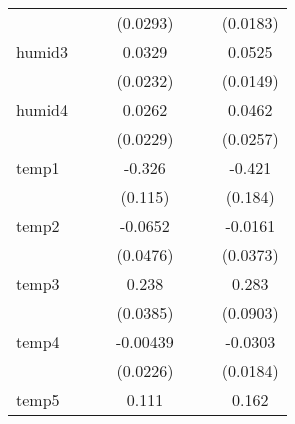 {\begin{tabular}{l*{6}{c}}
            &                     &                     &    (0.0293)         &                     &                     &    (0.0183)         \\
[1em]
humid3      &                     &                     &      0.0329         &                     &                     &      0.0525\sym{**} \\
            &                     &                     &    (0.0232)         &                     &                     &    (0.0149)         \\
[1em]
humid4      &                     &                     &      0.0262         &                     &                     &      0.0462         \\
            &                     &                     &    (0.0229)         &                     &                     &    (0.0257)         \\
[1em]
temp1       &                     &                     &      -0.326\sym{**} &                     &                     &      -0.421\sym{*}  \\
            &                     &                     &     (0.115)         &                     &                     &     (0.184)         \\
[1em]
temp2       &                     &                     &     -0.0652         &                     &                     &     -0.0161         \\
            &                     &                     &    (0.0476)         &                     &                     &    (0.0373)         \\
[1em]
temp3       &                     &                     &       0.238\sym{***}&                     &                     &       0.283\sym{**} \\
            &                     &                     &    (0.0385)         &                     &                     &    (0.0903)         \\
[1em]
temp4       &                     &                     &    -0.00439         &                     &                     &     -0.0303         \\
            &                     &                     &    (0.0226)         &                     &                     &    (0.0184)         \\
[1em]
temp5       &                     &                     &       0.111\sym{*}  &                     &                     &       0.162\sym{**} \\

\end{tabular}}
